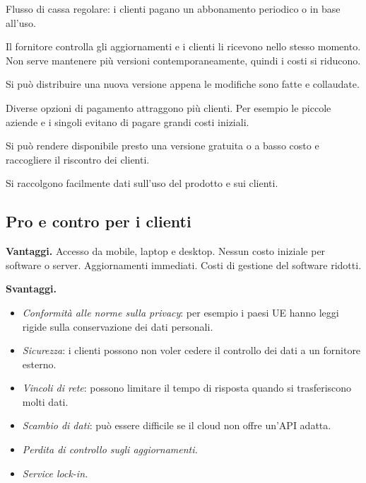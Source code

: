 \begin{description}[leftmargin=0pt, style=unboxed]
  \item[Cash flow.] Flusso di cassa regolare: i clienti pagano un abbonamento periodico o in base all'uso.
  \item[Update management.] Il fornitore controlla gli aggiornamenti e i clienti li ricevono nello stesso momento. Non
    serve mantenere più versioni contemporaneamente, quindi i costi si riducono.
  \item[Continuous deployment.] Si può distribuire una nuova versione appena le modifiche sono fatte e collaudate.
  \item[Payment flexibility.] Diverse opzioni di pagamento attraggono più clienti. Per esempio le piccole aziende e i
    singoli evitano di pagare grandi costi iniziali.
  \item[Try before you buy.] Si può rendere disponibile presto una versione gratuita o a basso costo e raccogliere il riscontro dei clienti.
  \item[Data collection.] Si raccolgono facilmente dati sull'uso del prodotto e sui clienti.
\end{description}

\subsection{Pro e contro per i clienti}

\textbf{Vantaggi.} Accesso da mobile, laptop e desktop. Nessun costo iniziale per software o server. Aggiornamenti
immediati. Costi di gestione del software ridotti.

\textbf{Svantaggi.}
\begin{itemize}
  \item \emph{Conformità alle norme sulla privacy}: per esempio i paesi UE hanno leggi rigide sulla conservazione
    dei dati personali.
  \item \emph{Sicurezza}: i clienti possono non voler cedere il controllo dei dati a un fornitore esterno.
  \item \emph{Vincoli di rete}: possono limitare il tempo di risposta quando si trasferiscono molti dati.
  \item \emph{Scambio di dati}: può essere difficile se il cloud non offre un'API adatta.
  \item \emph{Perdita di controllo sugli aggiornamenti.}
  \item \emph{Service lock-in.}
\end{itemize}

